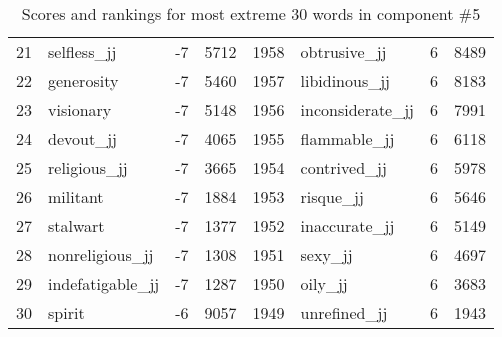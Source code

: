 \begin{table}[tbp]
\begin{tabular}{| rlr@{.}l | rlr@{.}l |}
    21 & selfless\_jj & -7 & 5712    &    1958 & obtrusive\_jj & 6 & 8489 \\
    22 & generosity & -7 & 5460    &    1957 & libidinous\_jj & 6 & 8183 \\
    23 & visionary & -7 & 5148    &    1956 & inconsiderate\_jj & 6 & 7991 \\
    24 & devout\_jj & -7 & 4065    &    1955 & flammable\_jj & 6 & 6118 \\
    25 & religious\_jj & -7 & 3665    &    1954 & contrived\_jj & 6 & 5978 \\
    26 & militant & -7 & 1884    &    1953 & risque\_jj & 6 & 5646 \\
    27 & stalwart & -7 & 1377    &    1952 & inaccurate\_jj & 6 & 5149 \\
    28 & nonreligious\_jj & -7 & 1308    &    1951 & sexy\_jj & 6 & 4697 \\
    29 & indefatigable\_jj & -7 & 1287    &    1950 & oily\_jj & 6 & 3683 \\
    30 & spirit & -6 & 9057    &    1949 & unrefined\_jj & 6 & 1943 \\
    \hline
    \end{tabular}
    \caption{Scores and rankings for most extreme 30 words in component \#5} 
\end{table}
\clearpage
